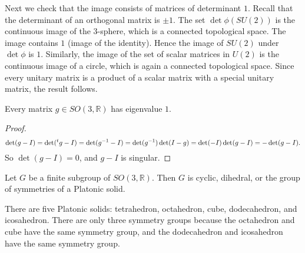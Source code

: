 \documentclass{llncs}
\newcommand{\ring}[1]{\mathbb{#1}}
\def\t#1{\hbox{}^t#1}
\begin{document}
Next we check that the image consists of matrices of determinant $1$.
Recall that the determinant of an orthogonal matrix is $\pm 1$.
The set $\det\phi(SU(2))$ is the continuous image of the $3$-sphere, which is a connected topological space.  The
image contains $1$ (image of the identity).  Hence the image of $SU(2)$ under $\det\phi$ is $1$.  Similarly,
the image of the set of scalar matrices in $U(2)$ is the continuous image of a circle, which is again a connected
topological space.  Since every unitary matrix is a product of a scalar matrix with a special unitary matrix,
the result follows.

\begin{lemma} Every matrix $g\in SO(3,\ring{R})$ has  eigenvalue $1$.
\end{lemma}

\begin{proof}
\[
\det (g-I) = \det(\t{g}-I) = \det(g^{-1}-I) = \det(g^{-1})\det(I - g) = 
\det(-I)\det(g - I) = -\det(g-I).
\]
So $\det(g-I)=0$, and $g-I$ is singular.
\end{proof}

\begin{theorem}
Let $G$ be a finite subgroup of $SO(3,\ring{R})$.  Then $G$ is cyclic, dihedral,
or the group of symmetries of a Platonic solid.
\end{theorem}

There are five Platonic solids: tetrahedron, octahedron, cube, dodecahedron, and icosahedron.
There are only three symmetry groups because the octahedron and cube have the same symmetry group,
and the dodecahedron and icosahedron have the same symmetry group.
\end{document}
